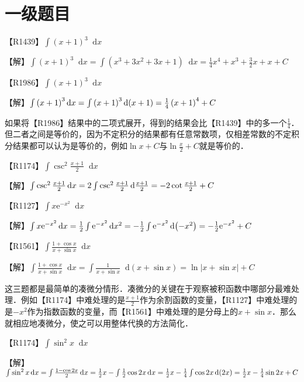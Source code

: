 \documentclass{ctexbook}
\newcommand{\e}{\mathrm{e}}
\newcommand*{\dif}{\mathop{}\!\mathrm{d}}
\begin{document}
\chapter{一级题目}
【R1439】$\int\left(x+1\right)^{3}\dif{x}$\par
【解】$\int\left(x+1\right)^{3}\dif{x}=\int\left(x^{3}+3x^{2}+3x+1\right)\dif{x}=\frac{1}{4}x^{4}+x^{3}+\frac{3}{2}x+x+C$\par
【R1986】$\int\left(x+1\right)^{3}\dif{x}$\par
【解】$\int\left(x+1\right)^{3}\dif{x}\\=\int\left(x+1\right)^{3}\dif{\left(x+1\right)}\\=\frac{1}{4}\left(x+1\right)^{4}+C$\par
{\kaishu 如果将【R1986】结果中的二项式展开，得到的结果会比【R1439】中的多一个$\frac{1}{4}$．但二者之间是等价的，因为不定积分的结果都有任意常数项，仅相差常数的不定积分结果都可以认为是等价的，例如$\ln{x}+C$与$\ln{\frac{x}{2}}+C$就是等价的．}\par
【R1174】$\int\csc^{2}{\frac{x+1}{2}}\dif{x}$\par
【解】$\int\csc^{2}{\frac{x+1}{2}}\dif{x}\\=2\int\csc^{2}{\frac{x+1}{2}}\dif{\frac{x+1}{2}}\\=-2\cot{\frac{x+1}{2}}+C$\par
【R1127】$\int x\e^{-x^{2}}\dif{x}$\par
【解】$\int x\e^{-x^{2}}\dif{x}\\=\frac{1}{2}\int\e^{-x^{2}}\dif{x^{2}}\\=-\frac{1}{2}\int\e^{-x^{2}}\dif{\left(-x^{2}\right)}\\=-\frac{1}{2}\e^{-x^{2}}+C$\par
【R1561】$\int\frac{1+\cos{x}}{x+\sin{x}}\dif{x}$\par
【解】$\int\frac{1+\cos{x}}{x+\sin{x}}\dif{x}=\int\frac{1}{x+\sin{x}}\dif{\left(x+\sin{x}\right)}=\ln{\left|x+\sin{x}\right|}+C$\par
{\kaishu 这三题都是最简单的凑微分情形．凑微分的关键在于观察被积函数中哪部分最难处理．例如【R1174】中难处理的是$\frac{x+1}{2}$作为余割函数的变量，【R1127】中难处理的是$-x^{2}$作为指数函数的变量，而【R1561】中难处理的是分母上的$x+\sin{x}$．那么就相应地凑微分，使之可以用整体代换的方法简化．}\par
【R1174】$\int\sin^{2}{x}\dif{x}$\par
【解】$\int\sin^{2}{x}\dif{x}\\=\int\frac{1-\cos{2x}}{2}\dif{x}\\=\frac{1}{2}x-\int\frac{1}{2}\cos{2x}\dif{x}\\=\frac{1}{2}x-\frac{1}{4}\int\cos{2x}\dif{\left(2x\right)}\\=\frac{1}{2}x-\frac{1}{4}\sin{2x}+C$\par
\end{document}
